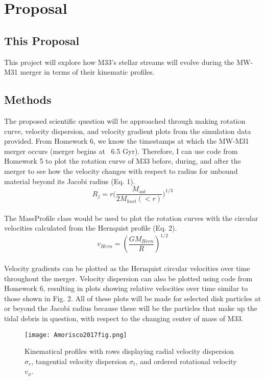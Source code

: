 \documentclass[linenumbers,trackchanges]{aastex7}
\begin{document}
\section{Proposal}
\subsection{This Proposal}
This project will explore how M33's stellar streams will evolve during the MW-M31 merger in terms of their kinematic profiles.
\subsection{Methods}
The proposed scientific question will be approached through making rotation curve, velocity dispersion, and velocity gradient plots from the simulation data provided. From Homework 6, we know the timestamps at which the MW-M31 merger occurs (merger begins at ~6.5 Gyr). Therefore, I can use code from Homework 5 to plot the rotation curve of M33 before, during, and after the merger to see how the velocity changes with respect to radius for unbound material beyond its Jacobi radius (Eq. 1).\\
\begin{equation} \label{eq:1}
    R_j = r  \bigg( \frac{M_{sat}}{2 M_{host}(<r)} \bigg)^{1/3}
\end{equation}\\
The MassProfile class would be used to plot the rotation curves with the circular velocities calculated from the Hernquist profile (Eq. 2).\\
\begin{equation} \label{eq:2}
    v_{Hern} = (\frac{GM_{Hern}}{R})^{1/2}
\end{equation}\\
Velocity gradients can be plotted as the Hernquist circular velocities over time throughout the merger. 
Velocity dispersion can also be plotted using code from Homework 6, resulting in plots showing relative velocities over time similar to those shown in Fig. 2.
All of these plots will be made for selected disk particles at or beyond the Jacobi radius because these will be the particles that make up the tidal debris in question, with respect to the changing center of mass of M33. 
\begin{figure}[h]
\centering
    \texttt{[image: Amorisco2017fig.png]}
    \label{fig:enter-label}
    \caption{Kinematical profiles with rows displaying radial velocity dispersion $\sigma_r$, tangential velocity dispersion $\sigma_t$, and ordered rotational velocity $v_{\phi}$\citep{10.1093/mnras/stw2229}.}
\end{figure}
\end{document}
